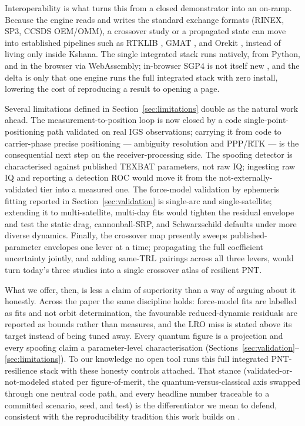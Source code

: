 Interoperability is what turns this from a closed demonstrator into an on-ramp. Because
the engine reads and writes the standard exchange formats (RINEX, SP3, CCSDS OEM/OMM),
a crossover study or a propagated state can move into established pipelines such as RTKLIB
\citep{takasu2009}, GMAT \citep{nasa_gmat}, and Orekit \citep{orekit}, instead of
living only inside Kshana. The single integrated stack runs natively, from Python, and
in the browser via WebAssembly; in-browser SGP4 is not itself new
\citep{satellitejs,sgp4crate}, and the delta is only that one engine runs the full
integrated stack with zero install, lowering the cost of reproducing a result to opening
a page.

Several limitations defined in Section~\ref{sec:limitations} double as the natural work
ahead. The measurement-to-position loop is now closed by a code single-point-positioning
path validated on real IGS observations; carrying it from code to carrier-phase precise
positioning --- ambiguity resolution and PPP/RTK --- is the consequential next step on
the receiver-processing side. The spoofing detector is characterised against published TEXBAT
\citep{humphreys2012texbat} parameters, not raw IQ; ingesting raw IQ and reporting a
detection ROC would move it from the not-externally-validated tier into a measured one.
The force-model validation by ephemeris fitting reported in
Section~\ref{sec:validation} is single-arc and single-satellite; extending it to
multi-satellite, multi-day fits would tighten the residual envelope and test the static
drag, cannonball-SRP, and Schwarzschild defaults under more diverse dynamics. Finally,
the crossover map presently sweeps published-parameter envelopes one lever at a time;
propagating the full coefficient uncertainty jointly, and adding same-TRL pairings
across all three levers, would turn today's three studies into a single crossover
atlas of resilient PNT.

What we offer, then, is less a claim of superiority than a way of arguing about it
honestly. Across the paper the same discipline holds: force-model fits are labelled as
fits and not orbit determination, the favourable reduced-dynamic residuals are reported
as bounds rather than measures, and the LRO miss is stated above its target instead of
being tuned away. Every quantum figure is a projection and every spoofing claim a parameter-level
characterisation (Sections~\ref{sec:validation}--\ref{sec:limitations}). To our knowledge
no open tool runs this full integrated PNT-resilience stack with these honesty controls
attached. That stance (validated-or-not-modeled stated per figure-of-merit, the
quantum-versus-classical axis swapped through one neutral code path, and every headline
number traceable to a committed scenario, seed, and test) is the differentiator we
mean to defend, consistent with the reproducibility tradition this work builds on
\citep{fernandezprades2018reproducibility,nasastd7009}.
